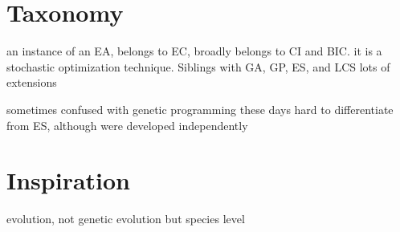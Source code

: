 \documentclass[a4paper, 11pt]{article}
\begin{document}
\section{Taxonomy}
\label{sec:taxonomy}
an instance of an EA, belongs to EC, broadly belongs to CI and BIC. it is a stochastic optimization technique.
Siblings with GA, GP, ES, and LCS
lots of extensions

sometimes confused with genetic programming
these days hard to differentiate from ES, although were developed independently

\section{Inspiration}
\label{sec:inspiration}

evolution, not genetic evolution but species level 


\end{document}
